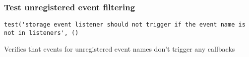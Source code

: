 \documentclass[a4paper]{article}
\begin{document}
\hypertarget{toc300}{}
\subsubsection{Test unregistered event filtering}

\begin{lstlisting}
test('storage event listener should not trigger if the event name is not in listeners', ()
\end{lstlisting}

Verifies that events for unregistered event names don't trigger
any callbacks

\end{document}
